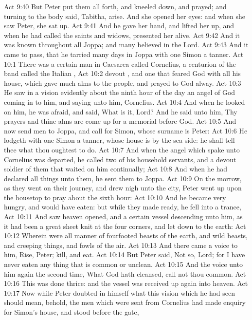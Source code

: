 \vs Act 9:40 But Peter put them all forth, and kneeled down, and prayed; and turning  to the body said, Tabitha, arise. And she opened her eyes: and when she saw Peter, she sat up.
\vs Act 9:41 And he gave her  hand, and lifted her up, and when he had called the saints and widows, presented her alive.
\vs Act 9:42 And it was known throughout all Joppa; and many believed in the Lord.
\vs Act 9:43 And it came to pass, that he tarried many days in Joppa with one Simon a tanner.
\vs Act 10:1 There was a certain man in Caesarea called Cornelius, a centurion of the band called the Italian ,
\vs Act 10:2  devout , and one that feared God with all his house, which gave much alms to the people, and prayed to God alway.
\vs Act 10:3 He saw in a vision evidently about the ninth hour of the day an angel of God coming in to him, and saying unto him, Cornelius.
\vs Act 10:4 And when he looked on him, he was afraid, and said, What is it, Lord? And he said unto him, Thy prayers and thine alms are come up for a memorial before God.
\vs Act 10:5 And now send men to Joppa, and call for  Simon, whose surname is Peter:
\vs Act 10:6 He lodgeth with one Simon a tanner, whose house is by the sea side: he shall tell thee what thou oughtest to do.
\vs Act 10:7 And when the angel which spake unto Cornelius was departed, he called two of his household servants, and a devout soldier of them that waited on him continually;
\vs Act 10:8 And when he had declared all  things unto them, he sent them to Joppa.
\vs Act 10:9 On the morrow, as they went on their journey, and drew nigh unto the city, Peter went up upon the housetop to pray about the sixth hour:
\vs Act 10:10 And he became very hungry, and would have eaten: but while they made ready, he fell into a trance,
\vs Act 10:11 And saw heaven opened, and a certain vessel descending unto him, as it had been a great sheet knit at the four corners, and let down to the earth:
\vs Act 10:12 Wherein were all manner of fourfooted beasts of the earth, and wild beasts, and creeping things, and fowls of the air.
\vs Act 10:13 And there came a voice to him, Rise, Peter; kill, and eat.
\vs Act 10:14 But Peter said, Not so, Lord; for I have never eaten any thing that is common or unclean.
\vs Act 10:15 And the voice  unto him again the second time, What God hath cleansed,  call not thou common.
\vs Act 10:16 This was done thrice: and the vessel was received up again into heaven.
\vs Act 10:17 Now while Peter doubted in himself what this vision which he had seen should mean, behold, the men which were sent from Cornelius had made enquiry for Simon's house, and stood before the gate,
